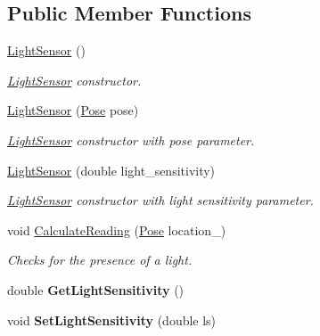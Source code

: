 \subsection*{Public Member Functions}
\begin{DoxyCompactItemize}
\item 
\hyperlink{classLightSensor_a43daac1a28e255523d53b012a2e0a302}{Light\+Sensor} ()\hypertarget{classLightSensor_a43daac1a28e255523d53b012a2e0a302}{}\label{classLightSensor_a43daac1a28e255523d53b012a2e0a302}

\begin{DoxyCompactList}\small\item\em \hyperlink{classLightSensor}{Light\+Sensor} constructor. \end{DoxyCompactList}\item 
\hyperlink{classLightSensor_a84b2c1be14f900ad1f68435b7152dbeb}{Light\+Sensor} (\hyperlink{structPose}{Pose} pose)\hypertarget{classLightSensor_a84b2c1be14f900ad1f68435b7152dbeb}{}\label{classLightSensor_a84b2c1be14f900ad1f68435b7152dbeb}

\begin{DoxyCompactList}\small\item\em \hyperlink{classLightSensor}{Light\+Sensor} constructor with pose parameter. \end{DoxyCompactList}\item 
\hyperlink{classLightSensor_ac39c170662695a958f153e634c5a3b87}{Light\+Sensor} (double light\+\_\+sensitivity)\hypertarget{classLightSensor_ac39c170662695a958f153e634c5a3b87}{}\label{classLightSensor_ac39c170662695a958f153e634c5a3b87}

\begin{DoxyCompactList}\small\item\em \hyperlink{classLightSensor}{Light\+Sensor} constructor with light sensitivity parameter. \end{DoxyCompactList}\item 
void \hyperlink{classLightSensor_a4090b56f0446111e68265801303b7d49}{Calculate\+Reading} (\hyperlink{structPose}{Pose} location\+\_\+)
\begin{DoxyCompactList}\small\item\em Checks for the presence of a light. \end{DoxyCompactList}\item 
double {\bfseries Get\+Light\+Sensitivity} ()\hypertarget{classLightSensor_a2d08474e0368f4826e3d7dcf9ea7fb88}{}\label{classLightSensor_a2d08474e0368f4826e3d7dcf9ea7fb88}

\item 
void {\bfseries Set\+Light\+Sensitivity} (double ls)\hypertarget{classLightSensor_ad81bf44b67b717493d594da45517c870}{}\label{classLightSensor_ad81bf44b67b717493d594da45517c870}

\end{DoxyCompactItemize}
